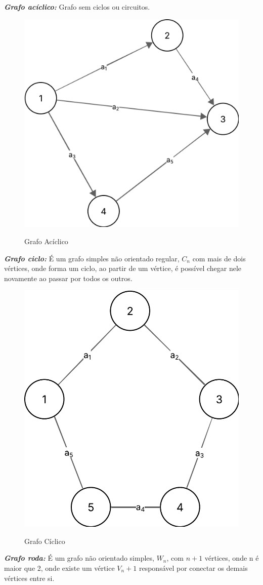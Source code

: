 	\textit{\textbf{Grafo acíclico:}} Grafo sem ciclos ou circuitos.\\
	\begin{figure} [H]
		\centering
		\caption{Grafo Acíclico}%
		\label{fig:grafAcicl}%
		\includegraphics[width=0.5\linewidth,angle=0]{figuras/tiposgrafos/grafAcicl.png}%
		\\
	\end{figure}
	\textit{\textbf{Grafo ciclo:}} É um grafo simples não orientado regular, $ C_n $ com mais de dois vértices, onde forma um ciclo, ao partir de um vértice, é possível chegar nele novamente ao passar por todos os outros.\\
	\begin{figure} [H]
		\centering
		\caption{Grafo Cíclico}%
		\label{fig:grafCiclo}%
		\includegraphics[width=0.5\linewidth,angle=0]{figuras/tiposgrafos/grafCiclo.png}%
		\\
	\end{figure}
	\textit{\textbf{Grafo roda:}} É um grafo não orientado simples, $ W_n $, com $ n+1 $ vértices, onde n é maior que 2, onde existe um vértice $ V_n+1 $ responsável por conectar os demais vértices entre si. \\
